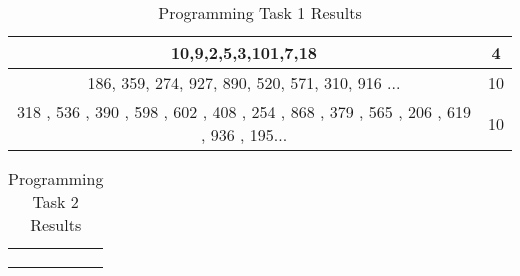 \documentclass{article}
\begin{document}
\maketitle
\begin{table}
    \centering
    \begin{tabular}{|c|c|} \hline 
          10,9,2,5,3,101,7,18& 4\\ \hline 
         186, 359, 274, 927, 890, 520, 571, 310, 916 ...& 10\\ \hline
 318 , 536 , 390 , 598 , 602 , 408 , 254 , 868 , 379 , 565 , 206 , 619 , 936 , 195...&10\\\hline
    \end{tabular}
    \caption{Programming Task 1 Results}
    \label{tab:my_label}
\end{table}

\begin{table}
    \centering
    \begin{tabular}{cc}
         & \\
         & \\
         & \\
    \end{tabular}
    \caption{Programming Task 2 Results}
    \label{tab:my_label}
\end{table}
\end{document}
